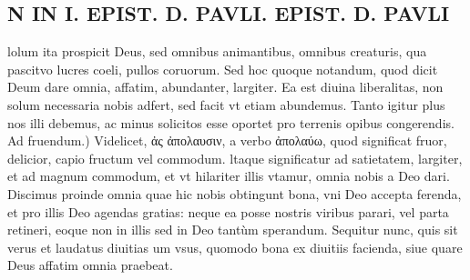 \documentclass{article}
\begin{document}
\begin{pages}
\section*{N IN I. EPIST. D. PAVLI. EPIST. D. PAVLI }
\marginpar{[ p.133 ]}\pstart lolum ita prospicit Deus, sed omnibus animantibus, omnibus creaturis, qua pascitvo lucres coeli, pullos coruorum. Sed hoc quoque notandum, quod dicit Deum dare omnia, affatim, abundanter, largiter. Ea est diuina liberalitas, non solum necessaria nobis adfert, sed facit vt etiam abundemus. Tanto igitur plus nos illi debemus, ac minus solicitos esse oportet pro terrenis opibus congerendis.  \pend\pstart Ad fruendum.) Videlicet, ἀς ἀπολαυσιν, a verbo ἀπολαύω, quod significat fruor, delicior, capio fructum vel commodum. ltaque significatur ad satietatem, largiter, et ad magnum commodum, et vt hilariter illis vtamur, omnia nobis a Deo dari. Discimus proinde omnia quae hic nobis obtingunt bona, vni Deo accepta ferenda, et pro illis Deo agendas gratias: neque ea posse nostris viribus parari, vel parta retineri, eoque non in illis sed in Deo tantùm sperandum. Sequitur nunc, quis sit verus et laudatus diuitias um vsus, quomodo bona ex diuitiis facienda, siue quare Deus affatim omnia praebeat.  \pend
{}
{}

\end{pages}
\end{document}
